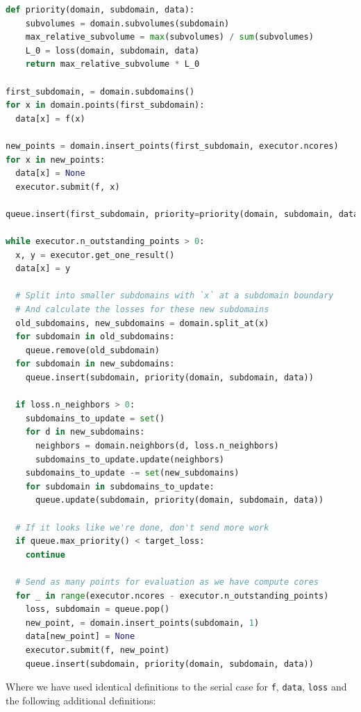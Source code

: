 \documentclass[english, twocolumn, 10pt, aps, superscriptaddress, floatfix, prb, citeautoscript]{revtex4-1}
\newcommand{\passthrough}[1]{\lstset{mathescape=false}#1\lstset{mathescape=true}}
\begin{document}
\begin{lstlisting}[language=Python]
def priority(domain, subdomain, data):
    subvolumes = domain.subvolumes(subdomain)
    max_relative_subvolume = max(subvolumes) / sum(subvolumes)
    L_0 = loss(domain, subdomain, data)
    return max_relative_subvolume * L_0

first_subdomain, = domain.subdomains()
for x in domain.points(first_subdomain):
  data[x] = f(x)

new_points = domain.insert_points(first_subdomain, executor.ncores)
for x in new_points:
  data[x] = None
  executor.submit(f, x)

queue.insert(first_subdomain, priority=priority(domain, subdomain, data))

while executor.n_outstanding_points > 0:
  x, y = executor.get_one_result()
  data[x] = y

  # Split into smaller subdomains with `x` at a subdomain boundary
  # And calculate the losses for these new subdomains
  old_subdomains, new_subdomains = domain.split_at(x)
  for subdomain in old_subdomains:
    queue.remove(old_subdomain)
  for subdomain in new_subdomains:
    queue.insert(subdomain, priority(domain, subdomain, data))

  if loss.n_neighbors > 0:
    subdomains_to_update = set()
    for d in new_subdomains:
      neighbors = domain.neighbors(d, loss.n_neighbors)
      subdomains_to_update.update(neighbors)
    subdomains_to_update -= set(new_subdomains)
    for subdomain in subdomains_to_update:
      queue.update(subdomain, priority(domain, subdomain, data))

  # If it looks like we're done, don't send more work
  if queue.max_priority() < target_loss:
    continue

  # Send as many points for evaluation as we have compute cores
  for _ in range(executor.ncores - executor.n_outstanding_points)
    loss, subdomain = queue.pop()
    new_point, = domain.insert_points(subdomain, 1)
    data[new_point] = None
    executor.submit(f, new_point)
    queue.insert(subdomain, priority(domain, subdomain, data))
\end{lstlisting}

Where we have used identical definitions to the serial case for \passthrough{\lstinline!f!}, \passthrough{\lstinline!data!}, \passthrough{\lstinline!loss!} and the following additional definitions:
\end{document}
